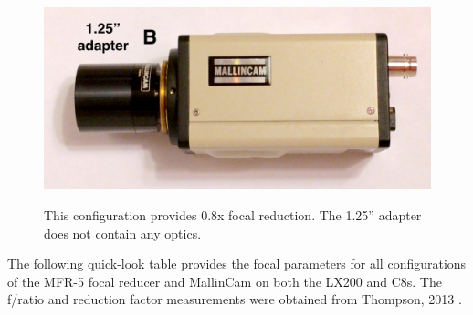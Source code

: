 \documentclass[12pt,titlepage]{article}
\begin{document}
\begin{appendix}
\begin{figure}[H]
\begin{center}
		\includegraphics[width=.6\textwidth]{./images/mallincam/focal_reduction/B_adapter.jpg} 
		\label{mfr5_B}
		\caption{This configuration provides 0.8x focal reduction.
				The 1.25'' adapter does not contain any optics.}
	\end{center}
\end{figure}
The following quick-look table provides the focal parameters for all configurations
of the MFR-5 focal reducer and MallinCam on both the LX200 and C8s.
The f/ratio and reduction factor measurements were obtained from Thompson, 2013 \cite{thompson13}.


\end{appendix}
\end{document}
